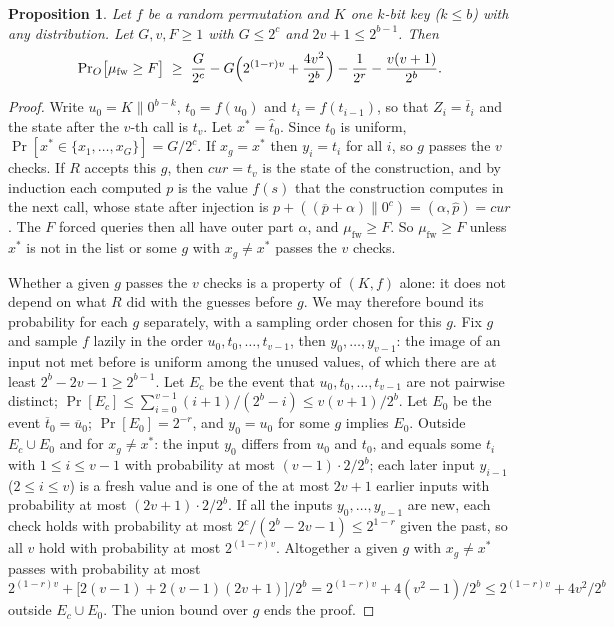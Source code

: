 \documentclass[11pt,a4paper]{article}
\newtheorem{proposition}{Proposition}
\theoremstyle{definition}
\theoremstyle{remark}
\newcommand{\outp}[1]{\overline{#1}}
\newcommand{\inp}[1]{\widehat{#1}}
\newcommand{\mufw}{\mu_{\mathrm{fw}}}
\begin{document}
\begin{proposition}\label{prop:f3}
Let $f$ be a random permutation and $K$ one $k$-bit key ($k \le b$) with any distribution. Let $G, v, F \ge 1$ with
$G \le 2^c$ and $2v + 1 \le 2^{b-1}$. Then
\[ \Pr\nolimits_O\bigl[\mufw \ge F\bigr] \;\ge\; \frac{G}{2^c} - G\Bigl(2^{(1-r)v} + \frac{4v^2}{2^b}\Bigr) - \frac{1}{2^r} - \frac{v(v+1)}{2^b} . \]
\end{proposition}
\begin{proof}
Write $u_0 = K \| 0^{b-k}$, $t_0 = f(u_0)$ and $t_i = f(t_{i-1})$, so that $Z_i = \outp{t}_i$ and the state after the $v$-th call is
$t_v$. Let $x^* = \inp{t}_0$. Since $t_0$ is uniform, $\Pr[x^* \in \{x_1, \dots, x_G\}] = G/2^c$. If $x_g = x^*$ then $y_i = t_i$ for all
$i$, so $g$ passes the $v$ checks. If $R$ accepts this $g$, then $\mathit{cur} = t_v$ is the state of the construction, and
by induction each computed $p$ is the value $f(s)$ that the construction computes in the next call, whose state after
injection is $p + ((\outp{p} + \alpha) \| 0^c) = (\alpha, \inp{p}) = \mathit{cur}$. The $F$ forced queries then all have outer part $\alpha$, and
$\mufw \ge F$. So $\mufw \ge F$ unless $x^*$ is not in the list or some $g$ with $x_g \ne x^*$ passes the $v$ checks.

Whether a given $g$ passes the $v$ checks is a property of $(K, f)$ alone: it does not depend on what $R$ did with the
guesses before $g$. We may therefore bound its probability for each $g$ separately, with a sampling order chosen for
this $g$. Fix $g$ and sample $f$ lazily in the order $u_0, t_0, \dots, t_{v-1}$, then $y_0, \dots, y_{v-1}$: the image of an input
not met before is uniform among the unused values, of which there are at least $2^b - 2v - 1 \ge 2^{b-1}$. Let $E_c$ be the
event that $u_0, t_0, \dots, t_{v-1}$ are not pairwise distinct; $\Pr[E_c] \le \sum_{i=0}^{v-1} (i+1)/(2^b - i) \le v(v+1)/2^b$.
Let $E_0$ be the event $\outp{t}_0 = \outp{u}_0$; $\Pr[E_0] = 2^{-r}$, and $y_0 = u_0$ for some $g$ implies $E_0$. Outside
$E_c \cup E_0$ and for $x_g \ne x^*$: the input $y_0$ differs from $u_0$ and $t_0$, and equals some $t_i$ with
$1 \le i \le v-1$ with probability at most $(v-1) \cdot 2/2^b$; each later input $y_{i-1}$ ($2 \le i \le v$) is a fresh
value and is one of the at most $2v + 1$ earlier inputs with probability at most $(2v+1) \cdot 2/2^b$. If all the
inputs $y_0, \dots, y_{v-1}$ are new, each check holds with probability at most $2^c/(2^b - 2v - 1) \le 2^{1-r}$ given
the past, so all $v$ hold with probability at most $2^{(1-r)v}$. Altogether a given $g$ with $x_g \ne x^*$ passes
with probability at most $2^{(1-r)v} + \bigl[2(v-1) + 2(v-1)(2v+1)\bigr]/2^b = 2^{(1-r)v} + 4(v^2-1)/2^b \le 2^{(1-r)v} + 4v^2/2^b$
outside $E_c \cup E_0$. The union bound over $g$ ends the proof.
\end{proof}
\end{document}
